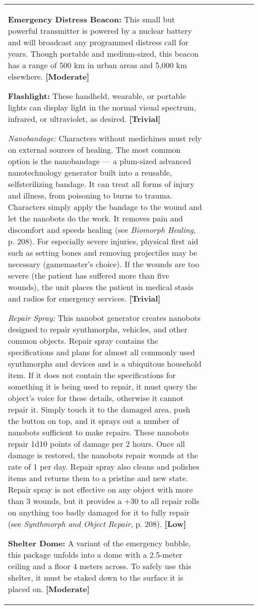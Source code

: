 \begin{tabular}{|l|l|l|l|l|l|l|}
\textbf{Emergency Distress Beacon:} This small but powerful transmitter is powered by a nuclear battery and will broadcast any programmed distress call for years. Though portable and medium-sized, this beacon has a range of 500 km in urban areas and 5,000 km elsewhere. \textbf{[Moderate]} 

\textbf{Flashlight:} These handheld, wearable, or portable lights can display light in the normal visual spectrum, infrared, or ultraviolet, as desired. \textbf{[Trivial]} 

\emph{Nanobandage:} Characters without medichines must rely on external sources of healing. The most common option is the nanobandage --- a plum-sized advanced nanotechnology generator built into a reusable, selfsterilizing bandage. It can treat all forms of injury and illness, from poisoning to burns to trauma. Characters simply apply the bandage to the wound and let the nanobots do the work. It removes pain and discomfort and speeds healing (see \emph{Biomorph Healing}, p. 208). For especially severe injuries, physical first aid such as setting bones and removing projectiles may be necessary (gamemaster’s choice). If the wounds are too severe (the patient has suffered more than five wounds), the unit places the patient in medical stasis and radios for emergency services. \textbf{[Trivial]} 

\emph{Repair Spray:} This nanobot generator creates nanobots designed to repair synthmorphs, vehicles, and other common objects. Repair spray contains the specifications and plans for almost all commonly used synthmorphs and devices and is a ubiquitous household item. If it does not contain the specifications for something it is being used to repair, it must query the object’s voice for these details, otherwise it cannot repair it. Simply touch it to the damaged area, push the button on top, and it sprays out a number of nanobots sufficient to make repairs. These nanobots repair 1d10 points of damage per 2 hours. Once all damage is restored, the nanobots repair wounds at the rate of 1 per day. Repair spray also cleans and polishes items and returns them to a pristine and new state. Repair spray is not effective on any object with more than 3 wounds, but it provides a +30 to all repair rolls on anything too badly damaged for it to fully repair (see \emph{Synthmorph and Object Repair}, p. 208). \textbf{[Low]} 

\textbf{Shelter Dome:} A variant of the emergency bubble, this package unfolds into a dome with a 2.5-meter ceiling and a floor 4 meters across. To safely use this shelter, it must be staked down to the surface it is placed on. \textbf{[Moderate]} 


\end{tabular}
